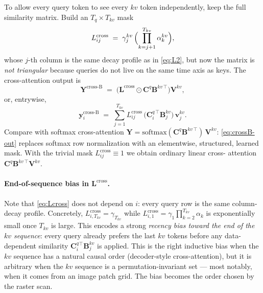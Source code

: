 \documentclass[11pt,a4paper]{article}
\begin{document}
To allow every query token to see every $kv$ token independently,
keep the full similarity matrix. Build an $T_q\times T_{kv}$ mask
\begin{equation}\label{eq:Lcross}
  L^{\text{cross}}_{ij} \;=\; \gamma_j^{kv}\,
        \Bigl(\prod_{k=j+1}^{T_{kv}}\alpha_k^{kv}\Bigr),
\end{equation}
whose $j$-th column is the same decay profile as in \eqref{eq:L2}, but
now the matrix is \emph{not triangular} because queries do not live on
the same time axis as keys. The cross-attention output is
\begin{equation}\label{eq:crossB-out}
  \boxed{\;\bm{Y}^{\text{cross-B}} \;=\; \bigl(\bm{L}^{\text{cross}}\odot\bm{C}^{q}\bm{B}^{kv\,\top}\bigr)\bm{V}^{kv},\;}
\end{equation}
or, entrywise,
\begin{equation}\label{eq:crossB-entry}
  \bm{y}_i^{\text{cross-B}} \;=\; \sum_{j=1}^{T_{kv}} L^{\text{cross}}_{ij}\,
           \bigl(\bm{C}_i^{q\,\top}\bm{B}_j^{kv}\bigr)\,\bm{v}_j^{kv}.
\end{equation}
Compare with softmax cross-attention
$\bm{Y} = \mathrm{softmax}(\bm{C}^q\bm{B}^{kv\,\top})\,\bm{V}^{kv}$:
\eqref{eq:crossB-out} replaces softmax row normalization with an
elementwise, structured, learned mask. With the trivial mask
$L^{\text{cross}}_{ij}\equiv 1$ we obtain ordinary linear cross-
attention $\bm{C}^q\bm{B}^{kv\,\top}\bm{V}^{kv}$.

\paragraph{End-of-sequence bias in $\bm{L}^{\text{cross}}$.} Note that
\eqref{eq:Lcross} does not depend on $i$: every query row is the same
column-decay profile. Concretely, $L^{\text{cross}}_{i,T_{kv}}=\gamma_{T_{kv}}$
while $L^{\text{cross}}_{i,1}=\gamma_1\prod_{k=2}^{T_{kv}}\alpha_k$ is
exponentially small once $T_{kv}$ is large. This encodes a strong
\emph{recency bias toward the end of the $kv$ sequence}: every query
already prefers the last $kv$ tokens before any data-dependent
similarity $\bm{C}^q_i{}^\top\bm{B}^{kv}_j$ is applied. This is the
right inductive bias when the $kv$ sequence has a natural causal order
(decoder-style cross-attention), but it is arbitrary when the $kv$
sequence is a permutation-invariant set — most notably, when it comes
from an image patch grid. The bias becomes the order chosen by the
raster scan.
\end{document}
